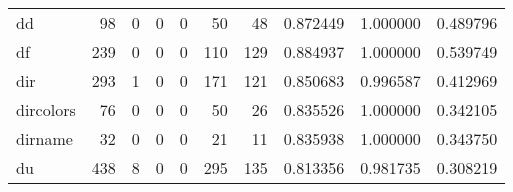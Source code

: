 \begin{longtable}{lrrrrrrrrr}
dd        &                                        98 &                                                  0 &                                                  0 &                                                  0 &                                                 50 &                                                 48 &                                           0.872449 &                               1.000000 &                             0.489796 \\
df        &                                       239 &                                                  0 &                                                  0 &                                                  0 &                                                110 &                                                129 &                                           0.884937 &                               1.000000 &                             0.539749 \\
dir       &                                       293 &                                                  1 &                                                  0 &                                                  0 &                                                171 &                                                121 &                                           0.850683 &                               0.996587 &                             0.412969 \\
dircolors &                                        76 &                                                  0 &                                                  0 &                                                  0 &                                                 50 &                                                 26 &                                           0.835526 &                               1.000000 &                             0.342105 \\
dirname   &                                        32 &                                                  0 &                                                  0 &                                                  0 &                                                 21 &                                                 11 &                                           0.835938 &                               1.000000 &                             0.343750 \\
du        &                                       438 &                                                  8 &                                                  0 &                                                  0 &                                                295 &                                                135 &                                           0.813356 &                               0.981735 &                             0.308219 \\

\end{longtable}
